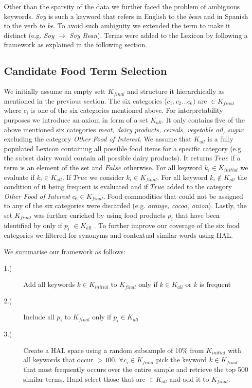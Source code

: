  Other than the sparsity of the data we further faced the problem of ambiguous keywords. \emph {Soy} is such a keyword that refers in English to the \emph{bean} and in Spanish to the verb \emph{to be}. To avoid such ambiguity we extended the term to make it distinct (e.g. \emph{Soy} $\to$  \emph{Soy Bean}). Terms were added to the Lexicon by following a framework as explained in the following section. 



\subsection{Candidate Food Term Selection}

We initially assume an empty sett $K_{final}$ and structure it hierarchically as mentioned in the previous section. The six categories ($c_1, c_2 ... c_6)$ are $\in K_{final}$ where $c_i$ is one of the six categories mentioned above. For interpretability purposes we introduce an axiom in form of a set $K_{all}$. It only contains five of the above mentioned six categories \emph{meat, dairy products, cereals, vegetable oil, sugar} excluding the category \emph{Other Food of Interest}. We assume that $K_{all}$ is a fully populated Lexicon containing all possible food items for a specific category (e.g. the subset dairy would contain all possible dairy products). It returns $True$ if a term is an element of the set and $False$ otherwise. For all keyword $k_i \in K_{initial}$ we evaluate if $k_i\in K_{all}$. If $True$ we consider $k_i \in K_{final}$. For all keyword $k_i \notin K_{all}$ the condition of it being frequent is evaluated and if $True$ added to the category \emph{Other Food of Interest}  $c_6 \in K_{final}$.  Food commodities that could not be assigned to any of the six categories were discarded (e.g. \emph {orange, cocoa, onion}). Lastly, the set $K_{final}$  was further enriched by using food products $p_i$ that have been identified by \cite{AbbarMW14}  only if $p_i$ $\in K_{all}$ . To further improve our coverage of the six food categories we filtered for synonyms and contextual similar words using HAL. 

We summarise our framework as follows: 

\begin{description}
  \item[1.)] Add all keywords $k \in K_{initial}$ to  $K_{final}$ only if $k \in K_{all} $ or $k$ is frequent 
  \item[2.)] Include all $p_i$ to $K_{final}$ only if $p_i \in K_{all}$
  \item[3.)] Create a HAL space using a random subsample of 10\% from $K_{initial}$ with all keywords that occur $> 100$. $\forall c_i \in K_{final} $  pick the keyword $k\in K_{final}$ that most frequently occurs over the entire sample and retrieve the top 500 similar terms. Hand select those that are $\in K_{all}$ and add it to $K_{final}$.
\end{description}


